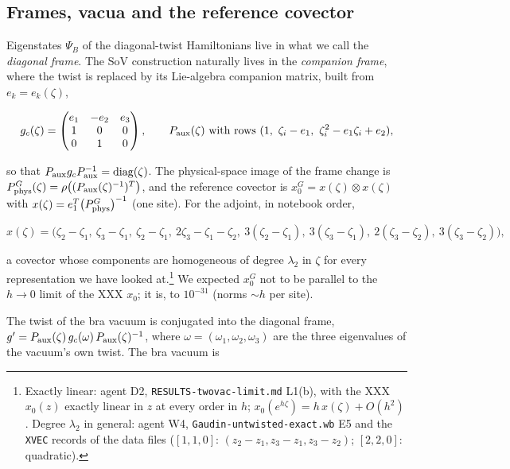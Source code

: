 \documentclass[11pt]{article}
\begin{document}
\subsection{Frames, vacua and the reference covector}\label{sec:frames}

Eigenstates $\Psi_B$ of the diagonal-twist Hamiltonians live in what we call the \emph{diagonal frame}.
The SoV construction naturally lives in the \emph{companion frame}, where the twist is replaced by its Lie-algebra companion matrix, built from $e_k=e_k(\zeta)$,

\begin{equation}
g_c(\zeta)=\begin{pmatrix}e_1&-e_2&e_3\\1&0&0\\0&1&0\end{pmatrix},\qquad P_{\rm aux}(\zeta)\ \text{with rows}\ (1,\ \zeta_i-e_1,\ \zeta_i^2-e_1\zeta_i+e_2),\label{eq:gc}
\end{equation}

so that $P_{\rm aux}g_cP_{\rm aux}^{-1}=\mathrm{diag}(\zeta)$. The physical-space image of the frame change is $P^G_{\rm phys}(\zeta)=\rho\bigl((P_{\rm aux}(\zeta)^{-1})^T\bigr)$, and the reference covector is $x_0^G=x(\zeta)\otimes x(\zeta)$ with $x(\zeta)=e_1^T\bigl(P^G_{\rm phys}\bigr)^{-1}$ (one site).
For the adjoint, in notebook order,

\begin{equation}
x(\zeta)=\bigl(\zeta_2-\zeta_1,\ \zeta_3-\zeta_1,\ \zeta_2-\zeta_1,\ 2\zeta_3-\zeta_1-\zeta_2,\ 3(\zeta_2-\zeta_1),\ 3(\zeta_3-\zeta_1),\ 2(\zeta_3-\zeta_2),\ 3(\zeta_3-\zeta_2)\bigr),\label{eq:x0}
\end{equation}

a covector whose components are homogeneous of degree $\lambda_2$ in $\zeta$ for every representation we have looked at.\footnote{Exactly linear: agent D2, \texttt{RESULTS-\allowbreak{}twovac-\allowbreak{}limit.\allowbreak{}md} L1(b), with the XXX $x_0(z)$ exactly linear in $z$ at every order in $h$; $x_0(e^{h\zeta})=h\,x(\zeta)+O(h^2)$. Degree $\lambda_2$ in general: agent W4, \texttt{Gaudin-\allowbreak{}untwisted-\allowbreak{}exact.\allowbreak{}wb} E5 and the \texttt{XVEC} records of the data files ($[1,1,0]$: $(z_2-z_1,z_3-z_1,z_3-z_2)$; $[2,2,0]$: quadratic).} We expected $x_0^G$ not to be parallel to the $h\to0$ limit of the XXX $x_0$; it is, to $10^{-31}$ (norms $\sim h$ per site).

The twist of the bra vacuum is conjugated into the diagonal frame, $g'=P_{\rm aux}(\zeta)\,g_c(\omega)\,P_{\rm aux}(\zeta)^{-1}$, where $\omega=(\omega_1,\omega_2,\omega_3)$ are the three eigenvalues of the vacuum's own twist.
The bra vacuum is
\end{document}
